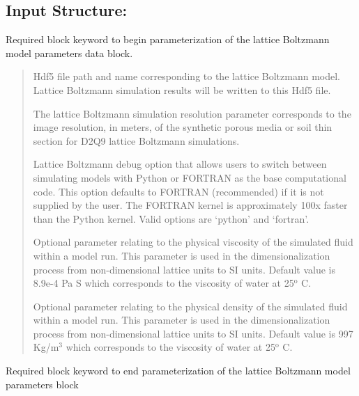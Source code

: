 \documentclass[letterpaper,10pt,english]{sphinxmanual}
\begin{document}
\subsection{Input Structure:}
\label{\detokenize{index:id1}}
 Required block keyword to begin
parameterization of the lattice Boltzmann model parameters data block.
\begin{quote}

 Hdf5 file path and name corresponding to the
lattice Boltzmann model. Lattice Boltzmann simulation results will
be written to this Hdf5 file.

 The lattice Boltzmann simulation resolution
parameter corresponds to the image resolution, in meters, of the
synthetic porous media or soil thin section for D2Q9 lattice
Boltzmann simulations.

 Lattice Boltzmann debug option that allows
users to switch between simulating models with Python or FORTRAN as
the base computational code. This option defaults to FORTRAN
(recommended) if it is not supplied by the user. The FORTRAN kernel
is approximately 100x faster than the Python kernel. Valid options
are ‘python’ and ‘fortran’.

 Optional parameter relating to
the physical viscosity of the simulated fluid within a model run.
This parameter is used in the dimensionalization process from
non-dimensional lattice units to SI units. Default value is 8.9e-4
Pa S which corresponds to the viscosity of water at 25$^{\text{o}}$ C.

 Optional parameter relating to the
physical density of the simulated fluid within a model run. This
parameter is used in the dimensionalization process from
non-dimensional lattice units to SI units. Default value is 997
Kg/m$^{\text{3}}$ which corresponds to the viscosity of water at
25$^{\text{o}}$ C.
\end{quote}

 Required block keyword to end
parameterization of the lattice Boltzmann model parameters block
\end{document}
